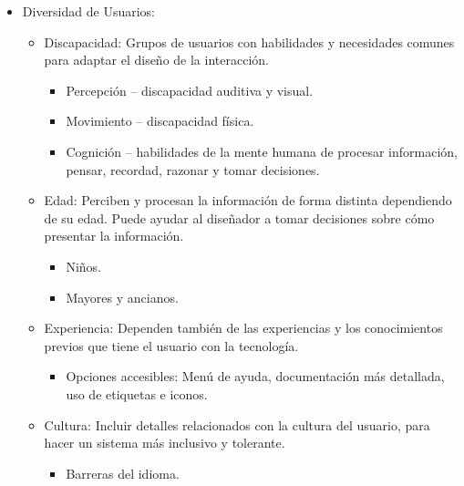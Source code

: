 \documentclass[12pt, twoside, openright]{report} %
\begin{document}
\begin{itemize}
	\item Diversidad de Usuarios:

	      \begin{itemize}
		      \item Discapacidad: Grupos de usuarios con habilidades y necesidades
		            comunes para adaptar el diseño de la interacción.

		            \begin{itemize}
			            \item Percepción -- discapacidad auditiva y visual.

			            \item Movimiento -- discapacidad física.

			            \item Cognición -- habilidades de la mente humana de procesar
			                  información, pensar, recordad, razonar y tomar decisiones.
		            \end{itemize}

		      \item Edad: Perciben y procesan la información de forma distinta
		            dependiendo de su edad. Puede ayudar al diseñador a tomar
		            decisiones sobre cómo presentar la información.

		            \begin{itemize}
			            \item Niños.

			            \item Mayores y ancianos.
		            \end{itemize}

		      \item Experiencia: Dependen también de las experiencias y los
		            conocimientos previos que tiene el usuario con la tecnología.

		            \begin{itemize}
			            \item Opciones accesibles: Menú de ayuda, documentación más detallada,
			                  uso de etiquetas e iconos.
		            \end{itemize}

		      \item Cultura: Incluir detalles relacionados con la cultura del usuario,
		            para hacer un sistema más inclusivo y tolerante.

		            \begin{itemize}
			            \item Barreras del idioma.


\end{itemize}
\end{itemize}
\end{itemize}
\end{document}
